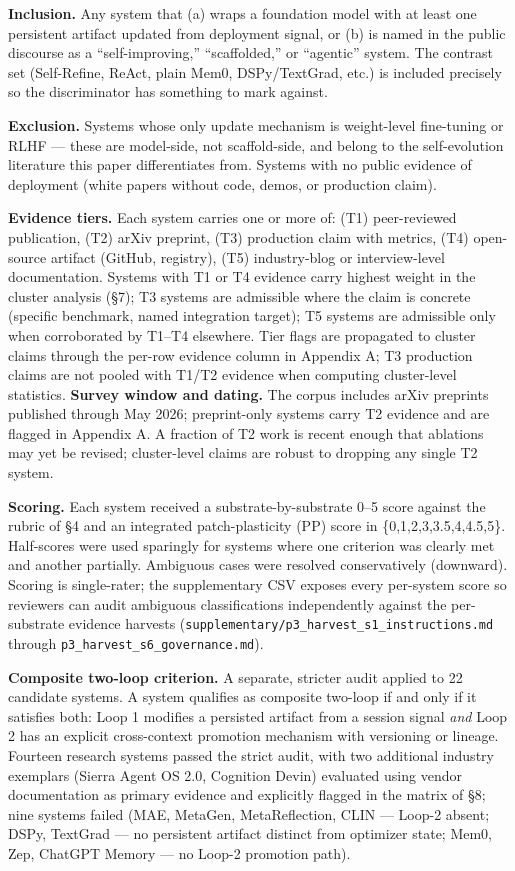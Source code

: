 \documentclass[
]{article}
\begin{document}
\textbf{Inclusion.} Any system that (a) wraps a foundation model with at
least one persistent artifact updated from deployment signal, or (b) is
named in the public discourse as a ``self-improving,'' ``scaffolded,''
or ``agentic'' system. The contrast set (Self-Refine, ReAct, plain Mem0,
DSPy/TextGrad, etc.) is included precisely so the discriminator has
something to mark against.

\textbf{Exclusion.} Systems whose only update mechanism is weight-level
fine-tuning or RLHF --- these are model-side, not scaffold-side, and
belong to the self-evolution literature this paper differentiates from.
Systems with no public evidence of deployment (white papers without
code, demos, or production claim).

\textbf{Evidence tiers.} Each system carries one or more of: (T1)
peer-reviewed publication, (T2) arXiv preprint, (T3) production claim
with metrics, (T4) open-source artifact (GitHub, registry), (T5)
industry-blog or interview-level documentation. Systems with T1 or T4
evidence carry highest weight in the cluster analysis (§7); T3 systems
are admissible where the claim is concrete (specific benchmark, named
integration target); T5 systems are admissible only when corroborated by
T1--T4 elsewhere. Tier flags are propagated to cluster claims through
the per-row evidence column in Appendix A; T3 production claims are not
pooled with T1/T2 evidence when computing cluster-level statistics.
\textbf{Survey window and dating.} The corpus includes arXiv preprints
published through May 2026; preprint-only systems carry T2 evidence and
are flagged in Appendix A. A fraction of T2 work is recent enough that
ablations may yet be revised; cluster-level claims are robust to
dropping any single T2 system.

\textbf{Scoring.} Each system received a substrate-by-substrate 0--5
score against the rubric of §4 and an integrated patch-plasticity (PP)
score in \{0,1,2,3,3.5,4,4.5,5\}. Half-scores were used sparingly for
systems where one criterion was clearly met and another partially.
Ambiguous cases were resolved conservatively (downward). Scoring is
single-rater; the supplementary CSV exposes every per-system score so
reviewers can audit ambiguous classifications independently against the
per-substrate evidence harvests
(\texttt{supplementary/p3\_harvest\_s1\_instructions.md} through
\texttt{p3\_harvest\_s6\_governance.md}).

\textbf{Composite two-loop criterion.} A separate, stricter audit
applied to 22 candidate systems. A system qualifies as composite
two-loop if and only if it satisfies both: Loop 1 modifies a persisted
artifact from a session signal \emph{and} Loop 2 has an explicit
cross-context promotion mechanism with versioning or lineage. Fourteen
research systems passed the strict audit, with two additional industry
exemplars (Sierra Agent OS 2.0, Cognition Devin) evaluated using vendor
documentation as primary evidence and explicitly flagged in the matrix
of §8; nine systems failed (MAE, MetaGen, MetaReflection, CLIN ---
Loop-2 absent; DSPy, TextGrad --- no persistent artifact distinct from
optimizer state; Mem0, Zep, ChatGPT Memory --- no Loop-2 promotion
path).
\end{document}

